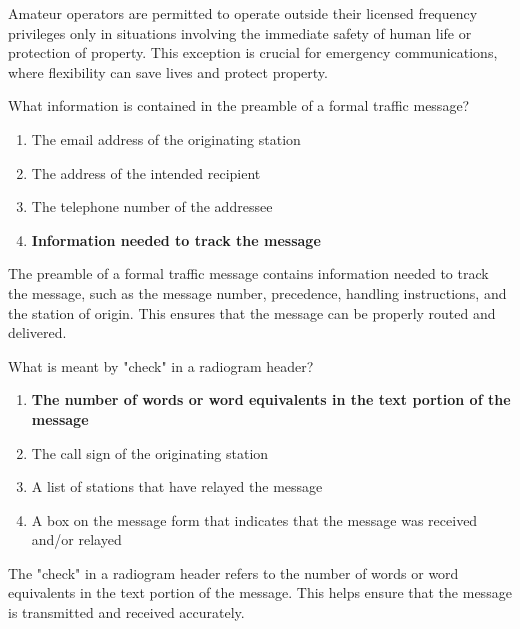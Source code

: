 Amateur operators are permitted to operate outside their licensed frequency privileges only in situations involving the immediate safety of human life or protection of property. This exception is crucial for emergency communications, where flexibility can save lives and protect property.


\begin{tcolorbox}[colback=gray!10!white,colframe=black!75!black,title={T2C10}]
    What information is contained in the preamble of a formal traffic message?
    \begin{enumerate}[label=\Alph*),noitemsep]
        \item The email address of the originating station
        \item The address of the intended recipient
        \item The telephone number of the addressee
        \item \textbf{Information needed to track the message}
    \end{enumerate}
\end{tcolorbox}

The preamble of a formal traffic message contains information needed to track the message, such as the message number, precedence, handling instructions, and the station of origin. This ensures that the message can be properly routed and delivered.


\begin{tcolorbox}[colback=gray!10!white,colframe=black!75!black,title={T2C11}]
    What is meant by "check" in a radiogram header?
    \begin{enumerate}[label=\Alph*),noitemsep]
        \item \textbf{The number of words or word equivalents in the text portion of the message}
        \item The call sign of the originating station
        \item A list of stations that have relayed the message
        \item A box on the message form that indicates that the message was received and/or relayed
    \end{enumerate}
\end{tcolorbox}

The "check" in a radiogram header refers to the number of words or word equivalents in the text portion of the message. This helps ensure that the message is transmitted and received accurately.


